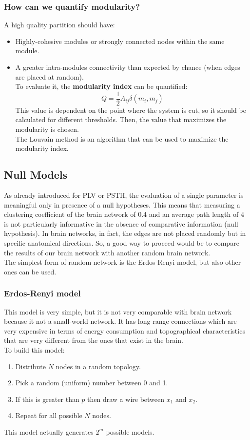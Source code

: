 \subsubsection{How can we quantify modularity?}
A high quality partition should have:
\begin{itemize}
    \item Highly-cohesive modules or strongly connected nodes within the same module.
    \item A greater intra-modules connectivity than expected by chance (when edges are placed at random).\\
    To evaluate it, the \textbf{modularity index} can be quantified:
    \begin{equation*}
        Q=\frac{1}{2}A_{ij}\delta(m_i,m_j)
    \end{equation*}
    This value is dependent on the point where the system is cut, so it should be calculated for different thresholds. Then, the value that maximizes the modularity is chosen.\\
    The Louvain method is an algorithm that can be used to maximize the modularity index.
\end{itemize}

\subsection{Null Models}
As already introduced for PLV or PSTH, the evaluation of a single parameter is meaningful only in presence of a null hypotheses. This means that measuring a clustering coefficient of the brain network of 0.4 and an average path length of 4 is not particularly informative in the absence of comparative information (null hypothesis).
In brain networks, in fact, the edges are not placed randomly but in specific anatomical directions. So, a good way to proceed would be to compare the results of our brain network with another random brain network.\\
The simplest form of random network is the Erdos-Renyi model, but also other ones can be used.
\subsubsection{Erdos-Renyi model}
This model is very simple, but it is not very comparable with brain network because it not a small-world network. It has long range connections which are very expensive in terms of energy consumption and topographical characteristics that are very different from the ones that exist in the brain.\\
To build this model:
\begin{enumerate}
    \item Distribute \(N\) nodes in a random topology.
    \item Pick a random (uniform) number between 0 and 1.
    \item If this is greater than \(p\) then draw a wire between \(x_1\) and \(x_2\).
    \item Repeat for all possible \(N\) nodes.
\end{enumerate}
This model actually generates \(2^m\) possible models.
